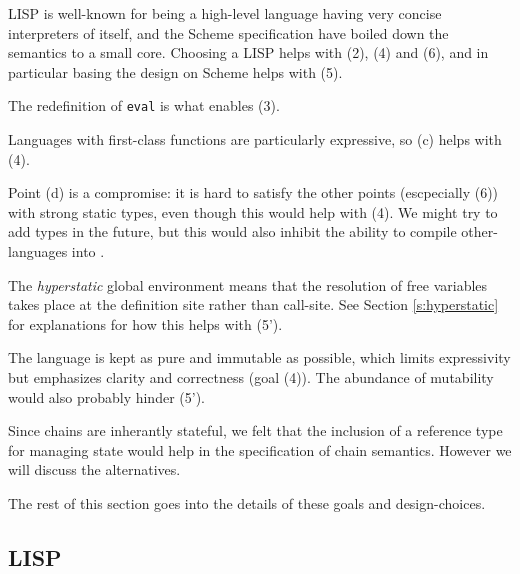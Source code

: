 LISP is well-known for being a high-level language having very concise
interpreters of itself, and the Scheme specification have boiled down the
semantics to a small core. Choosing a LISP helps with (2), (4) and (6), and in
particular basing the design on Scheme helps with (5).

The redefinition of \texttt{eval} is what enables (3).

Languages with first-class functions are particularly expressive, so (c) helps
with (4).

Point (d) is a compromise: it is hard to satisfy the other points (escpecially
(6)) with strong static types, even though this would help with (4). We might
try to add types in the future, but this would also inhibit the ability to
compile other-languages into \rad.

The \emph{hyperstatic} global environment means that the resolution of free
variables takes place at the definition site rather than call-site. See Section
\ref{s:hyperstatic} for explanations for how this helps with (5').

The language is kept as pure and immutable as possible, which limits
expressivity but emphasizes clarity and correctness (goal (4)). The abundance of
mutability would also probably hinder (5').

Since chains are inherantly stateful, we felt that the inclusion of a reference
type for managing state would help in the specification of chain semantics.
However we will discuss the alternatives.

The rest of this section goes into the details of these goals and
design-choices.




\subsection{LISP}


